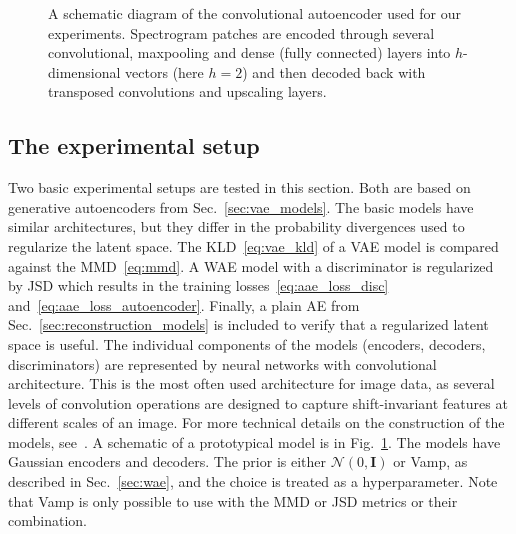 \begin{figure}[ht]
\begin{center}
\end{center}
\caption{A schematic diagram of the convolutional autoencoder used for our experiments. Spectrogram patches are encoded through several convolutional\cite{lecun1989backpropagation}, maxpooling\cite{ranzato2007efficient} and dense (fully connected) layers into $h$-dimensional vectors (here $h=2$) and then decoded back with transposed convolutions and upscaling layers.}
\label{fig:ae}
\end{figure}

\subsection{The experimental setup}
Two basic experimental setups are tested in this section. Both are based on generative autoencoders from Sec.~\ref{sec:vae_models}. The basic models have similar architectures, but they differ in the probability divergences used to regularize the latent space. The KLD~\eqref{eq:vae_kld} of a VAE model is compared against the MMD~\eqref{eq:mmd}. A WAE model with a discriminator is regularized by JSD which results in the training losses~\eqref{eq:aae_loss_disc} and~\eqref{eq:aae_loss_autoencoder}. Finally, a plain AE from Sec.~\ref{sec:reconstruction_models} is included to verify that a regularized latent space is useful. The individual components of the models (encoders, decoders, discriminators) are represented by neural networks with convolutional architecture. This is the most often used architecture for image data, as several levels of convolution operations are designed to capture shift-invariant features at different scales of an image. For more technical details on the construction of the models, see~\cite{vskvara2020detection}. A schematic of a prototypical model is in Fig.~\ref{fig:ae}. The models have Gaussian encoders and decoders. The prior is either $\mathcal{N}(0,\mathbf{I})$ or Vamp, as described in Sec.~\ref{sec:wae}, and the choice is treated as a hyperparameter. Note that Vamp is only possible to use with the MMD or JSD metrics or their combination.

